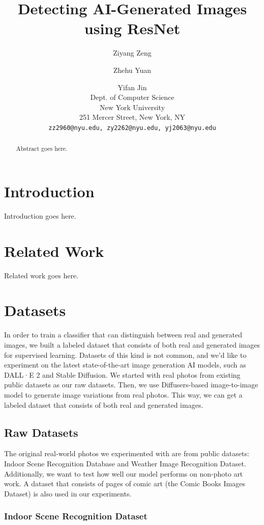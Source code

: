 \documentclass[11pt]{article}
\title{Detecting AI-Generated Images using ResNet}
\author{Ziyang Zeng \and Zhehu Yuan \and Yifan Jin \\
  Dept. of Computer Science \\
  New York University \\
  251 Mercer Street, New York, NY \\
  \texttt{zz2960@nyu.edu, zy2262@nyu.edu, yj2063@nyu.edu}}
\begin{document}
\maketitle
\begin{abstract}
  Abstract goes here.
\end{abstract}

\section{Introduction}

Introduction goes here.


\section{Related Work}

Related work goes here.

\section{Datasets}

In order to train a classifier that can distinguish between real and generated images, we built a labeled dataset that consists of both real and generated images for supervised learning. Datasets of this kind is not common, and we'd like to experiment on the latest state-of-the-art image generation AI models, such as DALL·E 2 and Stable Diffusion. We started with real photos from existing public datasets as our raw datasets. Then, we use Diffusers-based image-to-image model to generate image variations from real photos. This way, we can get a labeled dataset that consists of both real and generated images.

\subsection{Raw Datasets}
\label{sec:raw_datasets}

The original real-world photos we experimented with are from public datasets: Indoor Scene Recognition Database and Weather Image Recognition Dataset. Additionally, we want to test how well our model performs on non-photo art work. A dataset that consists of pages of comic art (the Comic Books Images Dataset) is also used in our experiments.

\subsubsection{Indoor Scene Recognition Dataset}
\end{document}
